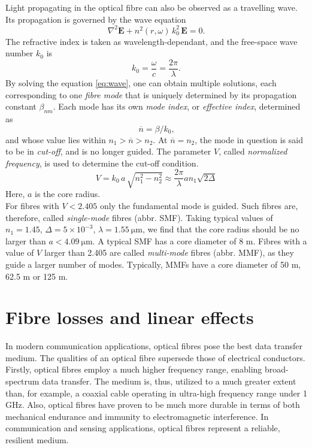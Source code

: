 \documentclass{standalone}
\begin{document}
Light propagating in the optical fibre can also be observed as a travelling wave. Its propagation is governed by the wave equation
\begin{equation} \label{eq:wave}
\nabla^2 \mathbf{E} + n^2(r,\omega) \, k_0^2 \, \mathbf{E} = 0 \textrm{.}
\end{equation}
The refractive index is taken as wavelength-dependant, and the free-space wave number $k_0$ is
\begin{equation}
k_0 = \frac{\omega}{c} = \frac{2 \pi}{\lambda} \textrm{.}
\end{equation}
By solving the equation \ref{eq:wave}, one can obtain multiple solutions, each corresponding to one \textit{fibre mode} that is uniquely determined by its propagation constant $\beta_{nm}$. Each mode has its own \textit{mode index}, or \textit{effective index}, determined as
\begin{equation}
\overline{n} = \beta/k_0 \textrm{,}
\end{equation}
and whose value lies within $n_1 > \overline{n} > n_2$. At $\overline{n} = n_2$, the mode in question is said to be in \textit{cut-off}, and is no longer guided. The parameter $V$, called \textit{normalized frequency}, is used to determine the cut-off condition.
\begin{equation}
V = k_0 \, a \, \sqrt{n_1^2 - n_2^2} \approx \frac{2 \pi}{\lambda} a n_1 \sqrt{2 \varDelta}
\end{equation}
Here, $a$ is the core radius. \\

For fibres with $V < 2.405$ only the fundamental mode is guided. Such fibres are, therefore, called \textit{single-mode} fibres (abbr. SMF). Taking typical values of $n_1 = 1.45$, $\varDelta = 5 \times 10^{-3}$, $\lambda = \SI{1.55}{\micro \meter}$, we find that the core radius should be no larger than $a < \SI{4.09}{\micro \meter}$. A typical SMF has a core diameter of 8 \textmu m. Fibres with a value of $V$ larger than 2.405 are called \textit{multi-mode} fibres (abbr. MMF), as they guide a larger number of modes. Typically, MMFs have a core diameter of 50 \textmu m, 62.5 \textmu m or 125 \textmu m.


\section{Fibre losses and linear effects}

In modern communication applications, optical fibres pose the best data transfer medium. The qualities of an optical fibre supersede those of electrical conductors. Firstly, optical fibres employ a much higher frequency range, enabling broad-spectrum data transfer. The medium is, thus, utilized to a much greater extent than, for example, a coaxial cable operating in ultra-high frequency range under 1 GHz. Also, optical fibres have proven to be much more durable in terms of both mechanical endurance and immunity to electromagnetic interference. In communication and sensing applications, optical fibres represent a reliable, resilient medium. \\
\end{document}
